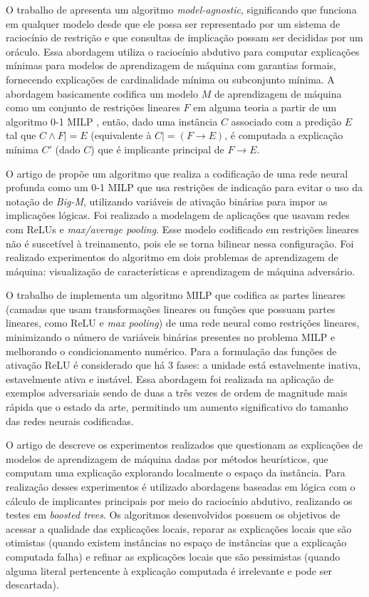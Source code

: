 O trabalho de  apresenta um algoritmo \textit{model-agnostic}, significando que funciona em qualquer modelo desde que ele possa ser representado por um sistema de raciocínio de restrição e que consultas de implicação possam ser decididas por um oráculo. Essa abordagem utiliza o raciocínio abdutivo para computar explicações mínimas para modelos de aprendizagem de máquina com garantias formais, fornecendo explicações de cardinalidade mínima ou subconjunto mínima. A abordagem basicamente codifica um modelo $M$ de aprendizagem de máquina como um conjunto de restrições lineares $F$ em alguma teoria a partir de um algoritmo 0-1 MILP \cite{milp_01}, então, dado uma instância $C$ associado com a predição $E$ tal que $C \wedge F |= E$ (equivalente à $C |= (F \rightarrow E)$, é computada a explicação mínima $C'$ (dado $C$) que é implicante principal de  $F \rightarrow E$. 

O artigo de  propõe um algoritmo que realiza a codificação de uma rede neural profunda como um 0-1 MILP que usa restrições de indicação para evitar o uso da notação de \textit{Big-M}, utilizando variáveis de ativação binárias para impor as implicações lógicas. Foi realizado a modelagem de aplicações que usavam redes com ReLUs e \textit{max/average pooling}. Esse modelo codificado em restrições lineares não é suscetível à treinamento, pois ele se torna bilinear nessa configuração. Foi realizado experimentos do algoritmo em dois problemas de aprendizagem de máquina: visualização de características e aprendizagem de máquina adversário.

O trabalho de  implementa um algoritmo MILP que codifica as partes lineares (camadas que usam transformações lineares ou funções que possuam partes lineares, como ReLU e \textit{max pooling}) de uma rede neural como restrições lineares, minimizando o número de variáveis binárias presentes no problema MILP e melhorando o condicionamento numérico. Para a formulação das funções de ativação ReLU é considerado que há 3 fases: a unidade está estavelmente inativa, estavelmente ativa e instável. Essa abordagem foi realizada na aplicação de exemplos adversariais sendo de duas a três vezes de ordem de magnitude mais rápida que o estado da arte, permitindo um aumento significativo do tamanho das redes neurais codificadas.

O artigo de  descreve os experimentos realizados que questionam as explicações de modelos de aprendizagem de máquina dadas por métodos heurísticos, que computam uma explicação explorando localmente o espaço da instância. Para realização desses experimentos é utilizado abordagens baseadas em lógica com o cálculo de implicantes principais por meio do raciocínio abdutivo, realizando os testes em \textit{boosted trees}. Os algoritmos desenvolvidos possuem os objetivos de acessar a qualidade das explicações locais, reparar as explicações locais que são otimistas (quando existem instâncias no espaço de instâncias que a explicação computada falha) e refinar as explicações locais que são pessimistas (quando alguma literal pertencente à explicação computada é irrelevante e pode ser descartada).

